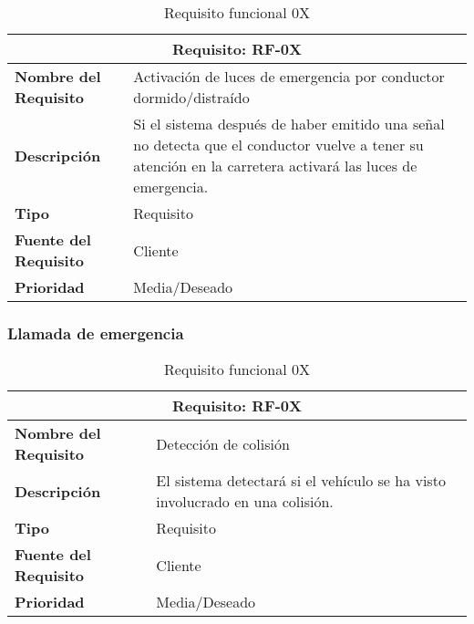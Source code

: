 \begin{table}[H]
\begin{center}
\begin{tabular}{p{} p{7cm}}
\multicolumn{2}{c}{\textbf{Requisito: RF-0X} } \\
\hline \hline
\textbf{Nombre del Requisito} & Activación de luces de emergencia por conductor dormido/distraído\\
\hline
\textbf{Descripción} &Si el sistema después de haber emitido una señal no detecta que el conductor vuelve a tener su atención en la carretera activará las luces de emergencia.\\
\hline
\textbf{Tipo} & Requisito  \\
\hline
\textbf{Fuente del Requisito} & Cliente  \\
\hline
\textbf{Prioridad} & Media/Deseado  \\ \hline
\end{tabular}
\caption{Requisito funcional 0X}
\label{tab:personal}
\end{center}
\end{table}

\subsubsection{Llamada de emergencia}

\begin{table}[H]
\begin{center}
\begin{tabular}{p{} p{7cm}}
\multicolumn{2}{c}{\textbf{Requisito: RF-0X} } \\
\hline \hline
\textbf{Nombre del Requisito} & Detección de colisión\\
\hline
\textbf{Descripción} &El sistema detectará si el vehículo se ha visto involucrado en una colisión.\\
\hline
\textbf{Tipo} & Requisito  \\
\hline
\textbf{Fuente del Requisito} & Cliente  \\
\hline
\textbf{Prioridad} & Media/Deseado  \\ \hline
\end{tabular}
\caption{Requisito funcional 0X}
\label{tab:personal}
\end{center}
\end{table}

